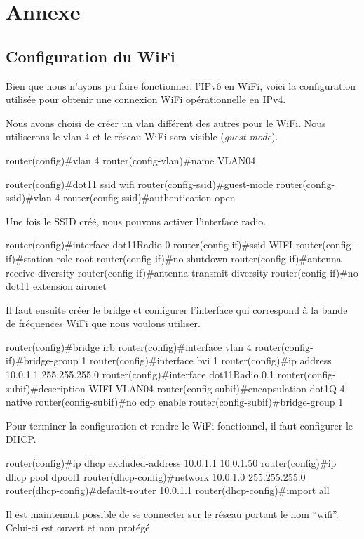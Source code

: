 \section{Annexe}

\subsection{Configuration du WiFi}

Bien que nous n'ayons pu faire fonctionner, l'IPv6 en WiFi, voici la configuration utilisée pour obtenir une connexion WiFi opérationnelle en IPv4.

Nous avons choisi de créer un vlan différent des autres pour le WiFi.
Nous utiliserons le vlan 4 et le réseau WiFi sera visible (\emph{guest-mode}).

\begin{code}
router(config)#vlan 4
router(config-vlan)#name VLAN04

router(config)#dot11 ssid wifi
router(config-ssid)#guest-mode
router(config-ssid)#vlan 4
router(config-ssid)#authentication open
\end{code}

Une fois le SSID créé, nous pouvons activer l'interface radio.

\begin{code}
router(config)#interface dot11Radio 0
router(config-if)#ssid WIFI
router(config-if)#station-role root
router(config-if)#no shutdown
router(config-if)#antenna receive diversity
router(config-if)#antenna transmit diversity
router(config-if)#no dot11 extension aironet
\end{code}

Il faut ensuite créer le bridge et configurer l'interface qui correspond à la bande de fréquences WiFi que nous voulons utiliser.

\begin{code}
router(config)#bridge irb
router(config)#interface vlan 4
router(config-if)#bridge-group 1
router(config)#interface bvi 1
router(config)#ip address 10.0.1.1 255.255.255.0
router(config)#interface dot11Radio 0.1
router(config-subif)#description WIFI VLAN04
router(config-subif)#encapsulation dot1Q 4 native
router(config-subif)#no cdp enable
router(config-subif)#bridge-group 1
\end{code}

Pour terminer la configuration et rendre le WiFi fonctionnel, il faut configurer le DHCP.

\begin{code}
router(config)#ip dhcp excluded-address 10.0.1.1 10.0.1.50
router(config)#ip dhcp pool dpool1
router(dhcp-config)#network 10.0.1.0 255.255.255.0
router(dhcp-config)#default-router 10.0.1.1
router(dhcp-config)#import all
\end{code}

Il est maintenant possible de se connecter sur le réseau portant le nom \enquote{wifi}.
Celui-ci est ouvert et non protégé.

